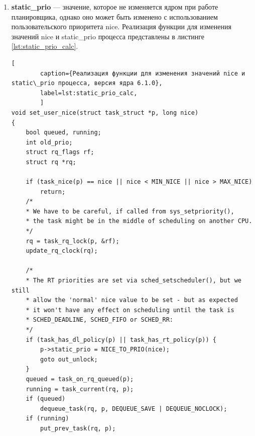 \begin{enumerate}[label*=\arabic*.]
\begin{lstlisting}[
		caption={Реализации функций для вычисления приоритета процесса, версия ядра 6.1.0},
		label=lst:prio_calc,
		]
	if (rt_prio(p->prio)) /* includes deadline */
		return p->prio; /* [-1, 99] */
	
	if (p->sched_class == &idle_sched_class)
		return MAX_RT_PRIO + NICE_WIDTH; /* 140 */
	
	return MAX_RT_PRIO + MAX_NICE; /* 120, squash fair */
}

/*
* Calculate the current priority, i.e. the priority
* taken into account by the scheduler. This value might
* be boosted by RT tasks, or might be boosted by
* interactivity modifiers. Will be RT if the task got
* RT-boosted. If not then it returns p->normal_prio.
*/
static int effective_prio(struct task_struct *p)
{
	p->normal_prio = normal_prio(p);
	/*
	* If we are RT tasks or we were boosted to RT priority,
	* keep the priority unchanged. Otherwise, update priority
	* to the normal priority:
	*/
	if (!rt_prio(p->prio))
		return p->normal_prio;
	return p->prio;
}
	\end{lstlisting}

	\item \textbf{static\_prio} --- значение, которое не изменяется ядром при работе планировщика, однако оно может быть изменено с использованием пользовательского приоритета nice. Реализация функции для изменения значений nice и static\_prio процесса представлены в листинге \ref{lst:static_prio_calc}. \cite{prio_calc}
	
	\begin{lstlisting}[
		caption={Реализация функции для изменения значений nice и static\_prio процесса, версия ядра 6.1.0},
		label=lst:static_prio_calc,
		]
void set_user_nice(struct task_struct *p, long nice)
{
	bool queued, running;
	int old_prio;
	struct rq_flags rf;
	struct rq *rq;
	
	if (task_nice(p) == nice || nice < MIN_NICE || nice > MAX_NICE)
		return;
	/*
	* We have to be careful, if called from sys_setpriority(),
	* the task might be in the middle of scheduling on another CPU.
	*/
	rq = task_rq_lock(p, &rf);
	update_rq_clock(rq);
	
	/*
	* The RT priorities are set via sched_setscheduler(), but we still
	* allow the 'normal' nice value to be set - but as expected
	* it won't have any effect on scheduling until the task is
	* SCHED_DEADLINE, SCHED_FIFO or SCHED_RR:
	*/
	if (task_has_dl_policy(p) || task_has_rt_policy(p)) {
		p->static_prio = NICE_TO_PRIO(nice);
		goto out_unlock;
	}
	queued = task_on_rq_queued(p);
	running = task_current(rq, p);
	if (queued)
		dequeue_task(rq, p, DEQUEUE_SAVE | DEQUEUE_NOCLOCK);
	if (running)
		put_prev_task(rq, p);
	

\end{lstlisting}
\end{enumerate}
